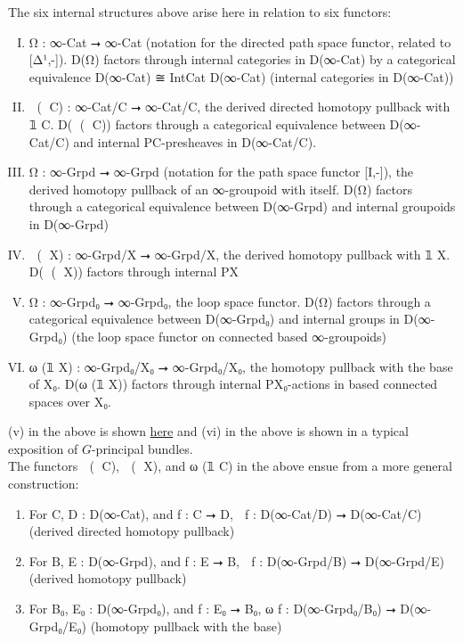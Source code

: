 \documentclass{book}
\theoremstyle{definition}
\begin{document}
The six internal structures above arise here in relation to six functors:\\

\begin{enumerate}[(I)]
\item Ω⃗ : ∞-Cat ⭢ ∞-Cat (notation for the directed path space functor, related to [Δ¹,-]). D(Ω⃗) factors through internal categories in D(∞-Cat) by a categorical equivalence D(∞-Cat) ≅ IntCat D(∞-Cat) (internal categories in D(∞-Cat))
\item ω⃗ (𝟙 C) : ∞-Cat/C ⭢ ∞-Cat/C, the derived directed homotopy pullback with 𝟙 C. D(ω⃗ (𝟙 C)) factors through a categorical equivalence between D(∞-Cat/C) and internal P⃗C-presheaves in D(∞-Cat/C).
\item Ω⃡ : ∞-Grpd ⭢ ∞-Grpd (notation for the path space functor [I,-]), the derived homotopy pullback of an ∞-groupoid with itself. D(Ω⃡) factors through a categorical equivalence between D(∞-Grpd) and internal groupoids in D(∞-Grpd)
\item ω⃡ (𝟙 X) : ∞-Grpd/X ⭢ ∞-Grpd/X, the derived homotopy pullback with 𝟙 X. D(ω⃡ (𝟙 X)) factors through internal P⃡X
\item Ω : ∞-Grpd₀ ⭢ ∞-Grpd₀, the loop space functor. D(Ω) factors through a categorical equivalence between D(∞-Grpd₀) and internal groups in D(∞-Grpd₀) (the loop space functor on connected based ∞-groupoids)
\item ω (𝟙 X) : ∞-Grpd₀/X₀ ⭢ ∞-Grpd₀/X₀, the homotopy pullback with the base of X₀. D(ω (𝟙 X)) factors through internal PX₀-actions in based connected spaces over X₀.
\end{enumerate}

(v) in the above is shown \href{https://mathoverflow.net/questions/128883/why-omega-x-and-bg-are-adjoint-functors}{here} and (vi) in the above is shown in a typical exposition of $G$-principal bundles.\\

The functors ω⃗ (𝟙 C), ω⃡ (𝟙 X), and ω (𝟙 C) in the above ensue from a more general construction:\\

\begin{enumerate}
\item For C, D : D(∞-Cat), and f : C ⭢ D, ω⃗ f : D(∞-Cat/D) ⭢ D(∞-Cat/C)   (derived directed homotopy pullback)
\item For B, E : D(∞-Grpd), and f : E ⭢ B, ω⃡ f : D(∞-Grpd/B) ⭢ D(∞-Grpd/E) (derived homotopy pullback)
\item For B₀, E₀ : D(∞-Grpd₀), and f : E₀ ⭢ B₀, ω f : D(∞-Grpd₀/B₀) ⭢ D(∞-Grpd₀/E₀) (homotopy pullback with the base)
\end{enumerate}
\end{document}
